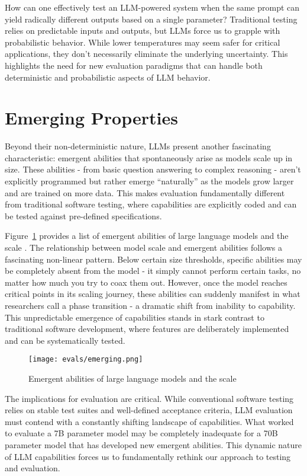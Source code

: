 How can one effectively test an LLM-powered system when the same prompt can yield radically different outputs based on a single parameter? Traditional testing relies on predictable inputs and outputs, but LLMs force us to grapple with probabilistic behavior. While lower temperatures may seem safer for critical applications, they don't necessarily eliminate the underlying uncertainty. This highlights the need for new evaluation paradigms that can handle both deterministic and probabilistic aspects of LLM behavior.

\section{Emerging Properties}

Beyond their non-deterministic nature, LLMs present another fascinating characteristic: emergent abilities that spontaneously arise as models scale up in size. These abilities - from basic question answering to complex reasoning - aren't explicitly programmed but rather emerge ``naturally'' as the models grow larger and are trained on more data. This makes evaluation fundamentally different from traditional software testing, where capabilities are explicitly coded and can be tested against pre-defined specifications.

Figure~\ref{fig:emerging-properties} provides a list of emergent abilities of large language models and the scale . The relationship between model scale and emergent abilities follows a fascinating non-linear pattern. Below certain size thresholds, specific abilities may be completely absent from the model - it simply cannot perform certain tasks, no matter how much you try to coax them out. However, once the model reaches critical points in its scaling journey, these abilities can suddenly manifest in what researchers call a phase transition - a dramatic shift from inability to capability. This unpredictable emergence of capabilities stands in stark contrast to traditional software development, where features are deliberately implemented and can be systematically tested.

\begin{figure}[h]
\centering
\texttt{[image: evals/emerging.png]}
\caption{Emergent abilities of large language models and the scale \cite{wei2022emergentabilitieslargelanguage}}
\label{fig:emerging-properties}
\end{figure}

The implications for evaluation are critical. While conventional software testing relies on stable test suites and well-defined acceptance criteria, LLM evaluation must contend with a constantly shifting landscape of capabilities. What worked to evaluate a 7B parameter model may be completely inadequate for a 70B parameter model that has developed new emergent abilities. This dynamic nature of LLM capabilities forces us to fundamentally rethink our approach to testing and evaluation.

